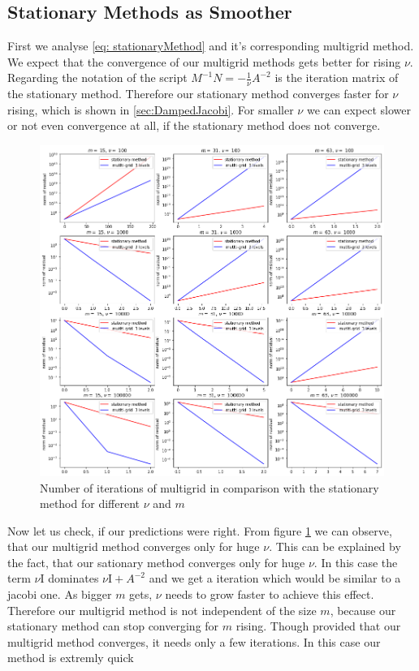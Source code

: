 \documentclass{amsart}
\theoremstyle{definition}
\theoremstyle{remark}
\numberwithin{equation}{section}
\newcommand{\Id}{\mathrm{I}}
\begin{document}
\subsection{Stationary Methods as Smoother}
First we analyse \eqref{eq: stationaryMethod} and it's corresponding multigrid method. We expect that the convergence of our multigrid methods 
gets better for rising $\nu$. Regarding the notation of the script $M^{-1} N = - \frac{1}{\nu} A^{-2} $ is the iteration matrix of the 
stationary method. Therefore our stationary method converges faster for $\nu $ rising, which is shown in \ref{sec:DampedJacobi}. For smaller $
\nu$ we can expect slower or not even convergence at all, if the stationary method does not converge. 


\begin{figure}[h!]
	\centering
	\includegraphics[scale=0.4]{./imgs/multigrid_stat_comparison_tiny}
	\caption{Number of iterations of multigrid in comparison with the stationary method for different $\nu$ and $m$}
	\label{fig: multigridStationary}
\end{figure}
Now let us check, if our predictions were right. From figure \ref{fig: multigridStationary} we can observe, that our multigrid method converges 
only for huge $\nu $. This can be explained by the fact, that our sationary method converges only for huge $\nu$. In this case the term $\nu 
\Id$ dominates $\nu \Id + A^{-2}$ and we get a iteration which would be similar to a jacobi one. As bigger $m$ gets, $\nu$ needs to grow faster 
to achieve this effect. Therefore our multigrid method is not independent of the size $m$, because our stationary method can stop converging 
for $m$ rising. Though provided that our multigrid method converges, it needs only a few iterations. In this case our method is extremly quick  
\end{document}
